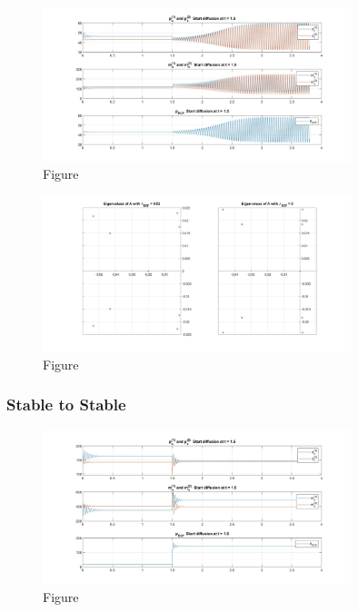 \documentclass[12pt]{article}
\renewcommand{\(}{\left (}
\renewcommand{\)}{\right )}
\begin{document}
\begin{figure}[ht]
    \centering
	\begin{minipage}{0.99\textwidth}
		\centering
		\includegraphics[width=0.8\textwidth]{SU.jpg}
		\caption*{\small Figure}
	\end{minipage}
\end{figure}

\begin{figure}[ht]
    \centering
	\begin{minipage}{0.99\textwidth}
		\centering
		\includegraphics[width=0.8\textwidth]{SUEi.jpg}
		\caption*{\small Figure}
	\end{minipage}
\end{figure}

\subsubsection{Stable to Stable}

\begin{figure}[ht]
    \centering
	\begin{minipage}{0.99\textwidth}
		\centering
		\includegraphics[width=0.8\textwidth]{SS.jpg}
		\caption*{\small Figure}
	\end{minipage}
\end{figure}
\end{document}
